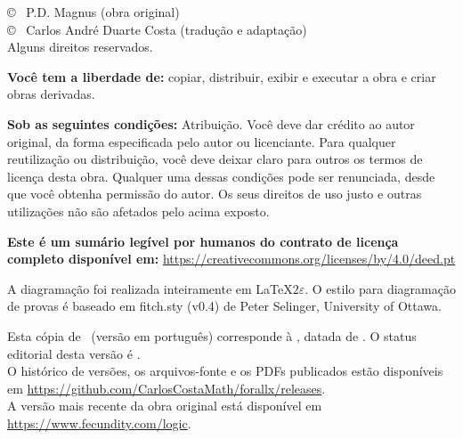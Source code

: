 \vfill
{
\copyright\  P.D. Magnus (obra original)\\
\copyright\  Carlos André Duarte Costa (tradução e adaptação)\\
Alguns direitos reservados.
}

{\footnotesize
\textbf{Você tem a liberdade de:} copiar, distribuir, exibir e executar a obra e criar obras derivadas.

\textbf{Sob as seguintes condições:} Atribuição. Você deve dar crédito ao autor original, da forma especificada pelo autor ou licenciante. Para qualquer reutilização ou distribuição, você deve deixar claro para outros os termos de licença desta obra. Qualquer uma dessas condições pode ser renunciada, desde que você obtenha permissão do autor. Os seus direitos de uso justo e outras utilizações não são afetados pelo acima exposto.

\textbf{Este é um sumário legível por humanos do contrato de licença completo disponível em:} \url{https://creativecommons.org/licenses/by/4.0/deed.pt}
}

{
A diagramação foi realizada inteiramente em \LaTeX$2\varepsilon$. O estilo para diagramação de provas é baseado em fitch.sty (v0.4) de Peter Selinger, University of Ottawa.

Esta cópia de \forallx\ (versão em português) corresponde à \textbf{\editionversion}, datada de \textbf{\editiondate}. O status editorial desta versão é \textbf{\editionstatus}.\\
O histórico de versões, os arquivos-fonte e os PDFs publicados estão disponíveis em \url{https://github.com/CarlosCostaMath/forallx/releases}.\\
A versão mais recente da obra original está disponível em \url{https://www.fecundity.com/logic}.
}
